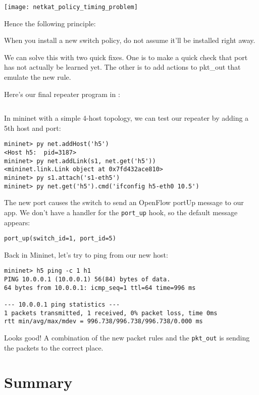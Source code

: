 \texttt{[image: netkat\_policy\_timing\_problem]}

Hence the following principle:

\begin{principle}
When you install a new switch policy, do not assume it'll be installed right away.  
\end{principle}

We can solve this with two quick fixes.  One is to make a quick check that port has not actually be learned yet.
The other is to add actions to pkt\_out that emulate the new rule.  

Here's our final repeater program in :

\inputminted{python}{code/netkat_principles/repeater5.py}

In mininet with a simple 4-host topology, we can test our repeater by adding a 5th host and port:

\begin{verbatim}
mininet> py net.addHost('h5')
<Host h5:  pid=3187>
mininet> py net.addLink(s1, net.get('h5'))
<mininet.link.Link object at 0x7fd432ace810>
mininet> py s1.attach('s1-eth5')
mininet> py net.get('h5').cmd('ifconfig h5-eth0 10.5')
\end{verbatim}

The new port causes the switch to send an OpenFlow portUp message to our app.  We don't have a handler for
the \texttt{port\_up} hook, so the default message appears:

\begin{verbatim}
port_up(switch_id=1, port_id=5)
\end{verbatim}

Back in Mininet, let's try to ping from our new host:

\begin{verbatim}
mininet> h5 ping -c 1 h1
PING 10.0.0.1 (10.0.0.1) 56(84) bytes of data.
64 bytes from 10.0.0.1: icmp_seq=1 ttl=64 time=996 ms

--- 10.0.0.1 ping statistics ---
1 packets transmitted, 1 received, 0% packet loss, time 0ms
rtt min/avg/max/mdev = 996.738/996.738/996.738/0.000 ms
\end{verbatim}

Looks good!  A combination of the new packet rules and the \texttt{pkt\_out} 
is sending the packets to the correct place.  

\section{Summary}

